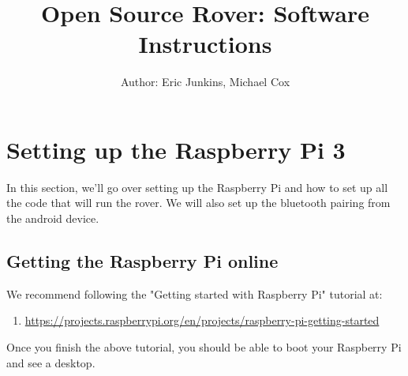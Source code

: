 \documentclass[12pt]{article}
\begin{document}
\title{Open Source Rover: Software Instructions}
\author{Author: Eric Junkins, Michael Cox}

\makeatletter         
\def\@maketitle{
\begin{center}	
	\makebox[\textwidth][c]{ \texttt{[image: "Pictures/software title".png]}}
	{\Huge \bfseries \sffamily \@title }\\[3ex] 
	{\Large\sffamily \@author}\\[3ex] 
	\texttt{[image: "Pictures/JPL logo".png]}
\end{center}}
\makeatother

\maketitle


\newpage


\tableofcontents

\newpage


\section{Setting up the Raspberry Pi 3}
In this section, we'll go over setting up the Raspberry Pi and how to set up all the code that will run the rover. We will also set up the bluetooth pairing from the android device.
\subsection{Getting the Raspberry Pi online}

We recommend following the "Getting started with Raspberry Pi" tutorial at:

\begin{enumerate}
	\item[] \href{https://projects.raspberrypi.org/en/projects/raspberry-pi-getting-started}{https://projects.raspberrypi.org/en/projects/raspberry-pi-getting-started}
\end{enumerate}

Once you finish the above tutorial, you should be able to boot your Raspberry Pi and see a desktop.
\end{document}
